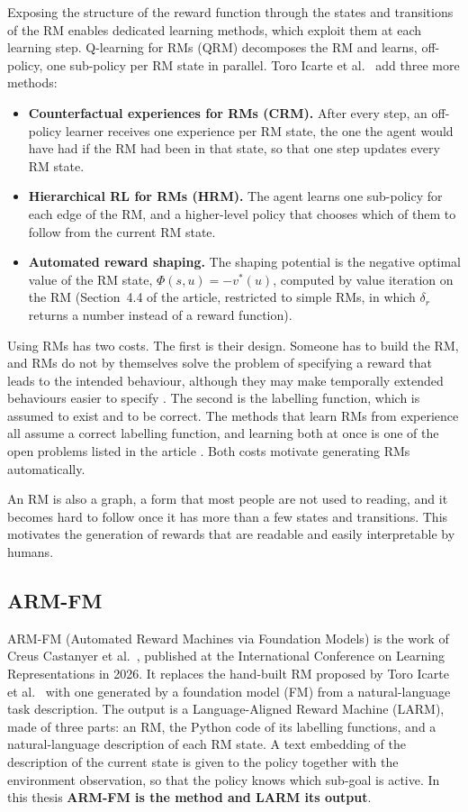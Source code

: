 \documentclass[11pt,english,listoffigures,listoftables]{tfgetsinf}
\begin{document}
Exposing the structure of the reward function through the states and transitions of the RM enables dedicated learning methods, which exploit them at each learning step. Q-learning for RMs (QRM) \cite{toroicarte2018using} decomposes the RM and learns, off-policy, one sub-policy per RM state in parallel. Toro Icarte et al.~\cite{icarte2022reward} add three more methods:
\begin{itemize}
    \item \textbf{Counterfactual experiences for RMs (CRM).} After every step, an off-policy learner receives one experience per RM state, the one the agent would have had if the RM had been in that state, so that one step updates every RM state.
    \item \textbf{Hierarchical RL for RMs (HRM).} The agent learns one sub-policy for each edge of the RM, and a higher-level policy that chooses which of them to follow from the current RM state.
    \item \textbf{Automated reward shaping.} The shaping potential is the negative optimal value of the RM state, $\Phi(s,u) = -v^{*}(u)$, computed by value iteration on the RM (Section~4.4 of the article, restricted to simple RMs, in which $\delta_r$ returns a number instead of a reward function).
\end{itemize}

Using RMs has two costs. The first is their design. Someone has to build the RM, and RMs do not by themselves solve the problem of specifying a reward that leads to the intended behaviour, although they may make temporally extended behaviours easier to specify \cite[p.~199]{icarte2022reward}. The second is the labelling function, which is assumed to exist and to be correct. The methods that learn RMs from experience all assume a correct labelling function, and learning both at once is one of the open problems listed in the article \cite[p.~201]{icarte2022reward}. Both costs motivate generating RMs automatically.

An RM is also a graph, a form that most people are not used to reading, and it becomes hard to follow once it has more than a few states and transitions. This motivates the generation of rewards that are readable and easily interpretable by humans.

\subsection{ARM-FM}
\label{sec:sota-armfm}
ARM-FM (Automated Reward Machines via Foundation Models) is the work of Creus Castanyer et al.~\cite{creus2026armfm}, published at the International Conference on Learning Representations in 2026. It replaces the hand-built RM proposed by Toro Icarte et al.~\cite{toroicarte2018using} with one generated by a foundation model (FM) from a natural-language task description. The output is a Language-Aligned Reward Machine (LARM), made of three parts: an RM, the Python code of its labelling functions, and a natural-language description of each RM state. A text embedding of the description of the current state is given to the policy together with the environment observation, so that the policy knows which sub-goal is active. In this thesis \textbf{ARM-FM is the method and LARM its output}.
\end{document}
